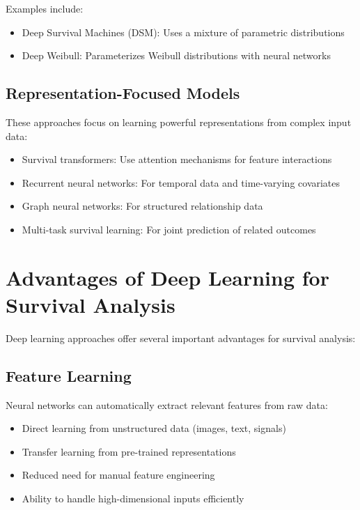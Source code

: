 Examples include:
\begin{itemize}
    \item Deep Survival Machines (DSM): Uses a mixture of parametric distributions
    \item Deep Weibull: Parameterizes Weibull distributions with neural networks
\end{itemize}

\subsection{Representation-Focused Models}

These approaches focus on learning powerful representations from complex input data:

\begin{itemize}
    \item Survival transformers: Use attention mechanisms for feature interactions
    \item Recurrent neural networks: For temporal data and time-varying covariates
    \item Graph neural networks: For structured relationship data
    \item Multi-task survival learning: For joint prediction of related outcomes
\end{itemize}

\section{Advantages of Deep Learning for Survival Analysis}

Deep learning approaches offer several important advantages for survival analysis:

\subsection{Feature Learning}

Neural networks can automatically extract relevant features from raw data:

\begin{itemize}
    \item Direct learning from unstructured data (images, text, signals)
    \item Transfer learning from pre-trained representations
    \item Reduced need for manual feature engineering
    \item Ability to handle high-dimensional inputs efficiently
\end{itemize}

